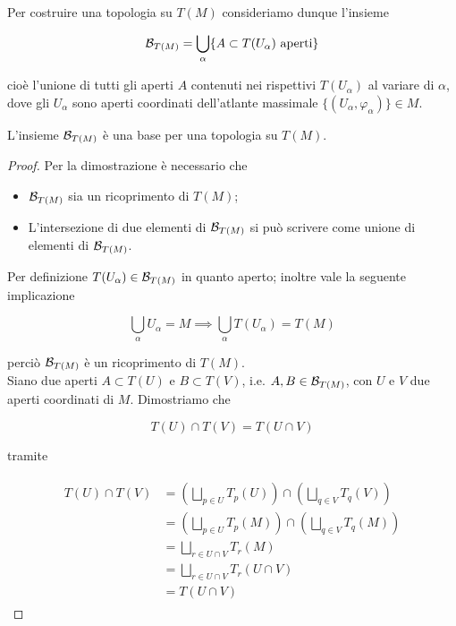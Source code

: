 Per costruire una topologia su $ T(M) $ consideriamo dunque l'insieme

\begin{equation}
	\mathcal{B}_{T(M)} = \bigcup_{\alpha} \{ A \subset T(U_{\alpha}) \text{ aperti} \}
\end{equation}

cioè l'unione di tutti gli aperti $ A $ contenuti nei rispettivi $ T(U_{\alpha}) $ al variare di $ \alpha $, dove gli $ U_{\alpha} $ sono aperti coordinati dell'atlante massimale $ \{ (U_{\alpha},\varphi_{\alpha}) \} \in M $.

\begin{definition}
	L'insieme $ \mathcal{B}_{T(M)} $ è una base per una topologia su $ T(M) $.
\end{definition}

\begin{proof}
	Per la dimostrazione è necessario che
	
	\begin{itemize}
		\item $ \mathcal{B}_{T(M)} $ sia un ricoprimento di $ T(M) $;
		
		\item L'intersezione di due elementi di $ \mathcal{B}_{T(M)} $ si può scrivere come unione di elementi di $ \mathcal{B}_{T(M)} $.
	\end{itemize}

	Per definizione $ T(U_{\alpha}) \in \mathcal{B}_{T(M)} $ in quanto aperto; inoltre vale la seguente implicazione
	
	\begin{equation}
		\bigcup_{\alpha} U_{\alpha} = M %
		\implies %
		\bigcup_{\alpha} T(U_{\alpha}) = T(M)
	\end{equation}

	perciò $ \mathcal{B}_{T(M)} $ è un ricoprimento di $ T(M) $. \\
	Siano due aperti $ A \subset T(U) $ e $ B \subset T(V) $, i.e. $ A,B \in \mathcal{B}_{T(M)} $, con $ U $ e $ V $ due aperti coordinati di $ M $. Dimostriamo che
	
	\begin{equation}
		T(U) \cap T(V) = T(U \cap V)
	\end{equation}

	tramite
	
	\begin{align}
		\begin{split}
			T(U) \cap T(V) &= \left( \bigsqcup_{p \in U} T_{p}(U) \right) \cap \left( \bigsqcup_{q \in V} T_{q}(V) \right) \\
			&= \left( \bigsqcup_{p \in U} T_{p}(M) \right) \cap \left( \bigsqcup_{q \in V} T_{q}(M) \right) \\
			&= \bigsqcup_{r \in U \cap V} T_{r}(M) \\
			&= \bigsqcup_{r \in U \cap V} T_{r}(U \cap V) \\
			&= T(U \cap V)
		\end{split}
	\end{align}
	

\end{proof}
